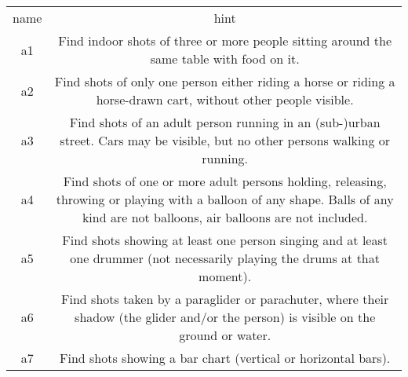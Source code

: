\begin{tabular}{cc}
name & hint\\
a1 & Find indoor shots of three or more people sitting around the same table with food on it.\\
a2 & Find shots of only one person either riding a horse or riding a horse-drawn cart, without other people visible.\\
a3 & Find shots of an adult person running in an (sub-)urban street. Cars may be visible, but no other persons walking or running.\\
a4 & Find shots of one or more adult persons holding, releasing, throwing or playing with a balloon of any shape. Balls of any kind are not balloons, air balloons are not included.\\
a5 & Find shots showing at least one person singing and at least one drummer (not necessarily playing the drums at that moment).\\
a6 & Find shots taken by a paraglider or parachuter, where their shadow (the glider and/or the person) is visible on the ground or water.\\
a7 & Find shots showing a bar chart (vertical or horizontal bars).\\
\end{tabular}
